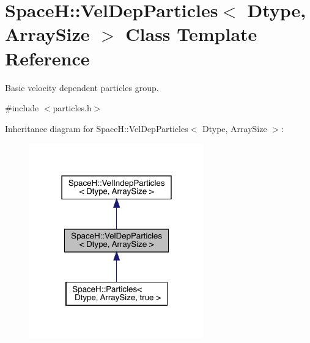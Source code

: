 \hypertarget{class_space_h_1_1_vel_dep_particles}{}\section{SpaceH\+:\+:Vel\+Dep\+Particles$<$ Dtype, Array\+Size $>$ Class Template Reference}
\label{class_space_h_1_1_vel_dep_particles}


Basic velocity dependent particles group.  




{\ttfamily \#include $<$particles.\+h$>$}



Inheritance diagram for SpaceH\+:\+:Vel\+Dep\+Particles$<$ Dtype, Array\+Size $>$\+:
\nopagebreak
\begin{figure}[H]
\begin{center}
\leavevmode
\includegraphics[width=214pt]{class_space_h_1_1_vel_dep_particles__inherit__graph}
\end{center}
\end{figure}


